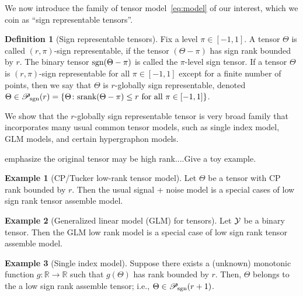 \documentclass{article}
\theoremstyle{plain}
\theoremstyle{definition}
\newtheorem{defn}{Definition}
\newtheorem{assumption}{Assumption}
\newtheorem{example}{Example}
\def\sign{\textup{sgn}}
\def\srank{\textup{srank}}
\def\caliP{\mathscr{P}_{\textup{sgn}}}
\begin{document}
We now introduce the family of tensor model~\eqref{eq:model} of our interest, which we coin as ``sign representable tensors''.
\begin{defn}[Sign representable tensors] 
Fix a level $\pi\in[-1,1]$. A tensor $\Theta$ is called $(r,\pi)$-sign representable, if the tensor $(\Theta-\pi)$ has sign rank bounded by $r$. %
The binary tensor $\sign(\Theta-\pi)$ is called the $\pi$-level sign tensor.
If a tensor $\Theta$ is $(r,\pi)$-sign representable for all $\pi\in[-1,1]$ except for a finite number of points, then we say that $\Theta$  is $r$-globally sign representable, denoted $\Theta \in \caliP(r)=\{\Theta\colon \srank(\Theta-\pi)\leq r \text{ for all }\pi\in[-1,1]\}$.
\end{defn}

 We show that the $r$-globally sign representable tensor is very broad family that incorporates many usual common tensor models, such as single index model, GLM models, and certain hypergraphon models. 

{\color{red}emphasize the original tensor may be high rank....Give a toy example.}

\begin{example}[CP/Tucker low-rank tensor model] Let $\Theta$ be a tensor with CP rank bounded by $r$. Then the usual signal + noise model is a special cases of low sign rank tensor assemble model. 
\end{example} 

\begin{example}[Generalized linear model (GLM) for tensors] Let $\mathcal{Y}$ be a binary tensor. Then the GLM low rank model is a special case of low sign rank tensor assemble model. 
\end{example}

\begin{example}[Single index model]
Suppose there exists a (unknown) monotonic function $g\colon \mathbb{R}\to \mathbb{R}$ such that $g(\Theta)$ has rank bounded by $r$. Then, $\Theta$ belongs to the a low sign rank assemble tensor; i.e.,  $\Theta\in \caliP(r+1)$.
\end{example}
\end{document}
